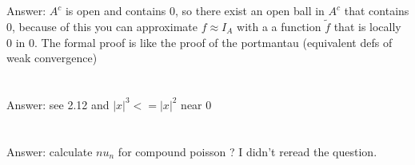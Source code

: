 \documentclass[a4paper,11pt]{article}
\begin{document}
\section{}
Answer:
$A^c$ is open and contains $0$, so there exist an open ball in $A^c$ that contains $0$, because of this
you can approximate $f \approx I_A$ with a a function $\tilde{f}$ that is locally $0$ in $0$. The formal proof is like
the proof of the portmantau (equivalent defs of weak convergence)

\section{}
Answer:
see 2.12 and $|x|^3<=|x|^2$ near $0$

\section{}
Answer: calculate $nu_n$ for compound poisson ? I didn't reread the question.
\end{document}

